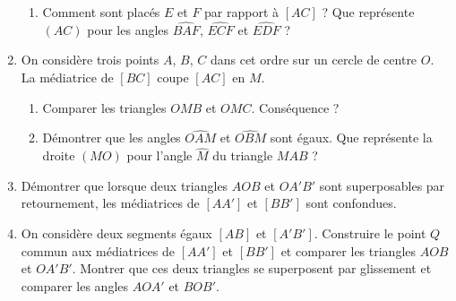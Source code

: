\documentclass[12 pt]{report}
\theoremstyle{plain}
\newcounter{n}
\begin{document}
\begin{enumerate}
\begin{enumerate}
\item Comment sont placés $E$ et $F$ par rapport à $[AC]$ ? Que représente $(AC)$ 
pour les angles $\widehat{BAF}$, $\widehat{ECF}$ et $\widehat{EDF}$ ? 
\end{enumerate}
\item On considère trois points $A$, $B$, $C$ dans cet ordre sur un cercle de centre $O$. La médiatrice de $[BC]$ coupe $[AC]$ en $M$. \begin{enumerate}
\item Comparer les triangles $OMB$ et $OMC$. Conséquence ? 
\item Démontrer que les angles $\widehat{OAM}$ et $\widehat{OBM}$ sont égaux. 
Que représente la droite $(MO)$ pour l'angle $\widehat{M}$ du triangle $MAB$ ?
\end{enumerate}
\item Démontrer que lorsque deux triangles $AOB$ et $OA'B'$ sont superposables par 
retournement, les médiatrices de $[AA']$ et $[BB']$ sont confondues. 
\item On considère deux segments égaux $[AB]$ et $[A'B']$. Construire le point $Q$ commun aux médiatrices de $[AA']$ et $[BB']$ et comparer les triangles $AOB$ et $OA'B'$. Montrer que ces deux triangles se superposent par glissement et comparer les angles $AOA'$ et $BOB'$. 
\end{enumerate}
\end{document}
